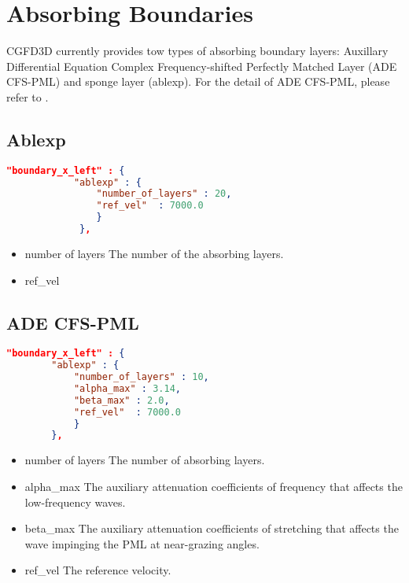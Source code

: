 \chapter{Absorbing Boundaries}\label{chapter-abs}
CGFD3D currently provides tow types of absorbing boundary layers: Auxillary Differential Equation Complex Frequency-shifted Perfectly Matched Layer (ADE CFS-PML) and sponge layer (ablexp). For the detail of ADE CFS-PML, please refer to \cite{zhang2010unsplit}. 
\section{Ablexp} 
	\begin{lstlisting}[language=json,
		frame=tb]    
		 "boundary_x_left" : {
		 	"ablexp" : {
		 		"number_of_layers" : 20,
		 		"ref_vel"  : 7000.0
		 		}
			 },
	\end{lstlisting}
\begin{itemize}
	\item number of layers
	The number of the absorbing layers. 
	\item ref_vel 
	
\end{itemize}
\section{ADE CFS-PML} 
\begin{lstlisting}[language=json,
	frame=tb]    
	"boundary_x_left" : {
		"ablexp" : {
			"number_of_layers" : 10,
			"alpha_max" : 3.14,
			"beta_max" : 2.0,
			"ref_vel"  : 7000.0
			}
		},
\end{lstlisting}
\begin{itemize}
	\item number of layers
	The number of absorbing layers.
	\item alpha_max
	The auxiliary attenuation coefficients of frequency that affects the low-frequency waves.
	\item beta_max
	The auxiliary attenuation coefficients of stretching that affects the wave impinging the PML at near-grazing angles.
	\item ref_vel
	The reference velocity.
\end{itemize}

